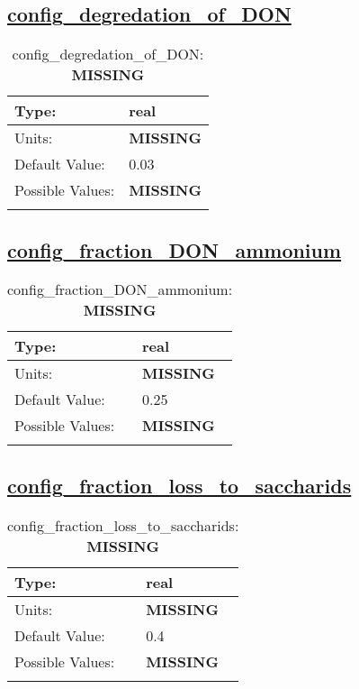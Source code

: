 \subsection[config\_degredation\_of\_DON]{\hyperref[sec:nm_tab_biogeochemistry]{config\_degredation\_of\_DON}}
\label{subsec:nm_sec_config_degredation_of_DON}
\begin{center}
\begin{longtable}{| p{2.0in} || p{4.0in} |}
    \hline
    Type: & real \\
    \hline
    Units: & {\bf \color{red} MISSING} \\
    \hline
    Default Value: & 0.03 \\
    \hline
    Possible Values: & {\bf \color{red} MISSING} \\
    \hline
    \caption{config\_degredation\_of\_DON: {\bf \color{red} MISSING}}
\end{longtable}
\end{center}
\subsection[config\_fraction\_DON\_ammonium]{\hyperref[sec:nm_tab_biogeochemistry]{config\_fraction\_DON\_ammonium}}
\label{subsec:nm_sec_config_fraction_DON_ammonium}
\begin{center}
\begin{longtable}{| p{2.0in} || p{4.0in} |}
    \hline
    Type: & real \\
    \hline
    Units: & {\bf \color{red} MISSING} \\
    \hline
    Default Value: & 0.25 \\
    \hline
    Possible Values: & {\bf \color{red} MISSING} \\
    \hline
    \caption{config\_fraction\_DON\_ammonium: {\bf \color{red} MISSING}}
\end{longtable}
\end{center}
\subsection[config\_fraction\_loss\_to\_saccharids]{\hyperref[sec:nm_tab_biogeochemistry]{config\_fraction\_loss\_to\_saccharids}}
\label{subsec:nm_sec_config_fraction_loss_to_saccharids}
\begin{center}
\begin{longtable}{| p{2.0in} || p{4.0in} |}
    \hline
    Type: & real \\
    \hline
    Units: & {\bf \color{red} MISSING} \\
    \hline
    Default Value: & 0.4 \\
    \hline
    Possible Values: & {\bf \color{red} MISSING} \\
    \hline
    \caption{config\_fraction\_loss\_to\_saccharids: {\bf \color{red} MISSING}}
\end{longtable}
\end{center}
